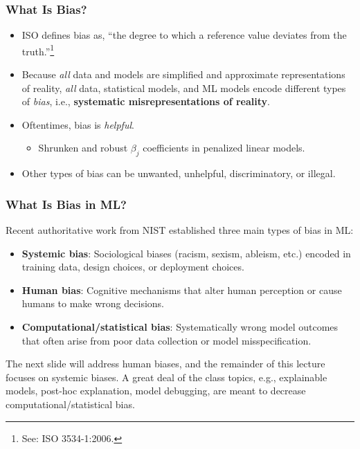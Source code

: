 \documentclass[11pt,aspectratio=169,hyperref={colorlinks}]{beamer}
\begin{document}
		\begin{frame}
		
			\frametitle{What Is Bias?}			
					
			\begin{itemize}
			\item ISO defines bias as, ``the degree to which a reference value deviates from the truth.''\footnote{See: ISO 3534-1:2006.} 
			\item Because \textit{all} data and models are simplified and approximate representations of reality, \textit{all} data, statistical models, and ML models encode different types of \textit{bias}, i.e., \textbf{systematic misrepresentations of reality}.\\
			\item Oftentimes, bias is \textit{helpful}.
				\begin{itemize}
					\item{Shrunken and robust $\beta_j$ coefficients in penalized linear models.}	\end{itemize}
			\item Other types of bias can be unwanted, unhelpful, discriminatory, or illegal. 

			\end{itemize}
		
		\end{frame}
		
		\begin{frame}
		
			\frametitle{What Is Bias in ML?}	
			
		Recent authoritative work from NIST \cite{schwartz2022towards} established three main types of bias in ML: 
		
			\begin{itemize}
				\item \textbf{Systemic bias}: Sociological biases (racism, sexism, ableism, etc.) encoded in training data, design choices, or deployment choices.  
				\item \textbf{Human bias}: Cognitive mechanisms that alter human perception or cause humans to make wrong decisions.
				\item \textbf{Computational/statistical bias}: Systematically wrong model outcomes that often arise from poor data collection or model misspecification. 
			\end{itemize}
			
		The next slide will address human biases, and the remainder of this lecture focuses on systemic biases. A great deal of the class topics, e.g., explainable models, post-hoc explanation, model debugging, are meant to decrease computational/statistical bias.
			
		\end{frame}					
		
\end{document}
